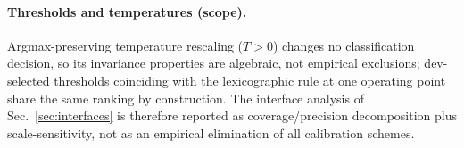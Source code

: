 \paragraph{Thresholds and temperatures (scope).} Argmax-preserving
temperature rescaling ($T>0$) changes no classification decision, so its
invariance properties are algebraic, not empirical exclusions; dev-selected
thresholds coinciding with the lexicographic rule at one operating point
share the same ranking by construction. The interface analysis of
Sec.~\ref{sec:interfaces} is therefore reported as coverage/precision
decomposition plus scale-sensitivity, not as an empirical elimination of
all calibration schemes.
